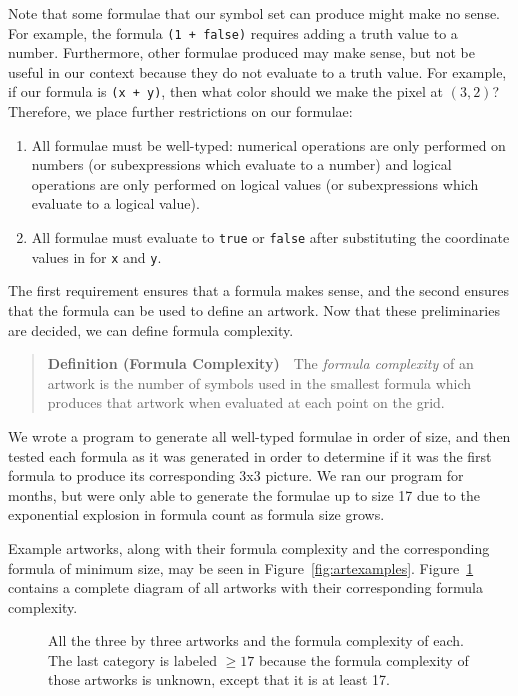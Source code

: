 \documentclass[11pt]{article}
\begin{document}
Note that some formulae that our symbol set can produce might make no sense.  For
example, the formula {\tt (1 + false)} requires adding a truth value to a
number.  Furthermore, other formulae produced may make sense, but not be useful
in our context because they do not evaluate to a truth value.  For example, if
our formula is {\tt (x + y)}, then what color should we make the pixel at
$(3,2)$?  Therefore, we place further restrictions on our formulae:
\begin{enumerate}
\item All formulae must be well-typed: numerical operations are only performed
on numbers (or subexpressions which evaluate to a number) and logical operations
are only performed on logical values (or subexpressions which evaluate to a
logical value).
\item All formulae must evaluate to {\tt true} or {\tt false} after
substituting the coordinate values in for {\tt x} and {\tt y}.
\end{enumerate}
The first requirement ensures that a formula makes sense, and the second
ensures that the formula can be used to define an artwork.  Now that these
preliminaries are decided, we can define formula complexity.

\begin{quote}\textbf{Definition (Formula Complexity)}~~The \emph{formula complexity} of an
artwork is the number of symbols used in the smallest formula which produces
that artwork when evaluated at each point on the grid.  
\end{quote}

We wrote a program to generate all well-typed formulae in order of size, and
then tested each formula as it was generated in order to determine if it was
the first formula to produce its corresponding 3x3 picture.  We ran our program for
months, but were only able to generate the formulae up to size 17 due to the
exponential explosion in formula count as formula size grows.  

Example artworks, along with their formula complexity and the corresponding
formula of minimum size, may be seen in Figure~\ref{fig:artexamples}.
Figure~\ref{fig:allthe3x3} contains a complete diagram of all artworks with
their corresponding formula complexity.

\begin{figure}
\begin{center}
\begin{sideways}

\end{sideways}
\end{center}

\caption{All the three by three artworks and the formula complexity of each.  The last category is labeled $\ge 17$ because the formula complexity of those artworks is unknown, except that it is at least 17.}
\label{fig:allthe3x3}
\end{figure}
\end{document}
